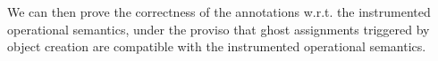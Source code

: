 We can then prove the correctness of the annotations w.r.t. the
instrumented operational semantics, under the proviso that ghost
assignments triggered by object creation are compatible with the
instrumented operational semantics. 








